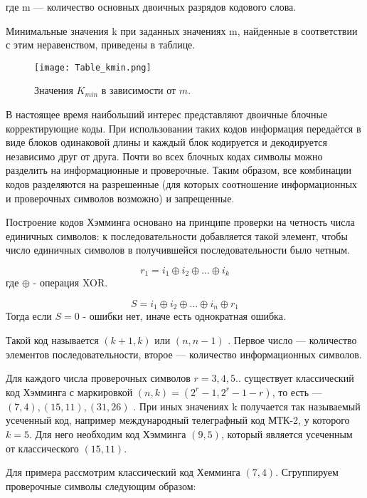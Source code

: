 где m — количество основных двоичных разрядов кодового слова.

Минимальные значения k при заданных значениях m, найденные в соответствии с этим неравенством, приведены в таблице.
\begin{figure}[H]
	\begin{center}
		\texttt{[image: Table\_kmin.png]}
		\caption{Значения $K_{min}$ в зависимости от $m$.} %
		\label{Table_kmin} %
	\end{center}
\end{figure}

В настоящее время наибольший интерес представляют двоичные блочные корректирующие коды. При использовании таких кодов информация передаётся в виде блоков одинаковой длины и каждый блок кодируется и декодируется независимо друг от друга. Почти во всех блочных кодах символы можно разделить на информационные и проверочные. Таким образом, все комбинации кодов разделяются на разрешенные (для которых соотношение информационных и проверочных символов возможно) и запрещенные.

Построение кодов Хэмминга основано на принципе проверки на четность числа единичных символов: к последовательности добавляется такой элемент, чтобы число единичных символов в получившейся последовательности было четным.

\begin{equation}
	r_1 = i_1 \oplus i_2 \oplus ... \oplus i_k
\end{equation}
где $\oplus$ - операция XOR.

\begin{equation}
	S = i_1 \oplus i_2 \oplus ... \oplus i_n \oplus r_1
\end{equation}
Тогда если $S = 0$ - ошибки нет, иначе есть однократная ошибка.

Такой код называется $(k+1,k)$ или $(n,n-1)$ . Первое число — количество элементов последовательности, второе — количество информационных символов.

Для каждого числа проверочных символов $ r=3,4,5..$ существует классический код Хэмминга с маркировкой $(n,k)=(2^{r}-1,2^{r}-1-r)$, то есть — $(7,4),(15,11),(31,26)$ . При иных значениях k получается так называемый усеченный код, например международный телеграфный код МТК-2, у которого $k=5$. Для него необходим код Хэмминга $(9,5)$, который является усеченным от классического $(15,11)$.

Для примера рассмотрим классический код Хемминга $(7,4)$. Сгруппируем проверочные символы следующим образом:

